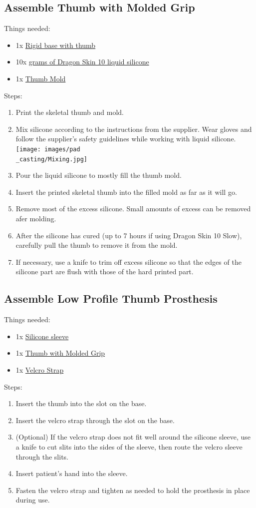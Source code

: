 \documentclass[11pt]{article}
\begin{document}
\subsection{Assemble Thumb with Molded Grip}
Things needed:
\begin{itemize}
\item 1x \hyperlink{thing_rigid\_base}{Rigid base with thumb}
\item 10x \hyperlink{thing_g\_dragon\_skin\_10}{grams of Dragon Skin 10 liquid silicone}
\item 1x \hyperlink{thing_thumb\_mold}{Thumb Mold}
\end{itemize}
Steps:
\begin{enumerate}
\item Print the skeletal thumb and mold.
\item Mix silicone according to the instructions from the supplier. Wear gloves and follow the supplier's safety guidelines while working with liquid silicone.\\ \texttt{[image: images/pad\\\_casting/Mixing.jpg]}
\item Pour the liquid silicone to mostly fill the thumb mold.
\item Insert the printed skeletal thumb into the filled mold as far as it will go.
\item Remove most of the excess silicone. Small amounts of excess can be removed afer molding.
\item After the silicone has cured (up to 7 hours if using Dragon Skin 10 Slow), carefully pull the thumb to remove it from the mold.
\item If necessary, use a knife to trim off excess silicone so that the edges of the silicone part are flush with those of the hard printed part.
\end{enumerate}

\subsection{Assemble Low Profile Thumb Prosthesis}
Things needed:
\begin{itemize}
\item 1x \hyperlink{thing_silicone\_sleeve}{Silicone sleeve}
\item 1x \hyperlink{thing_molded\_thumb}{Thumb with Molded Grip}
\item 1x \hyperlink{thing_velcro\_strap}{Velcro Strap}
\end{itemize}
Steps:
\begin{enumerate}
\item Insert the thumb into the slot on the base.
\item Insert the velcro strap through the slot on the base.
\item (Optional) If the velcro strap does not fit well around the silicone sleeve, use a knife to cut slits into the sides of the sleeve, then route the velcro sleeve through the slits.
\item Insert patient's hand into the sleeve.
\item Fasten the velcro strap and tighten as needed to hold the prosthesis in place during use.
\end{enumerate}

\newpage
\end{document}
